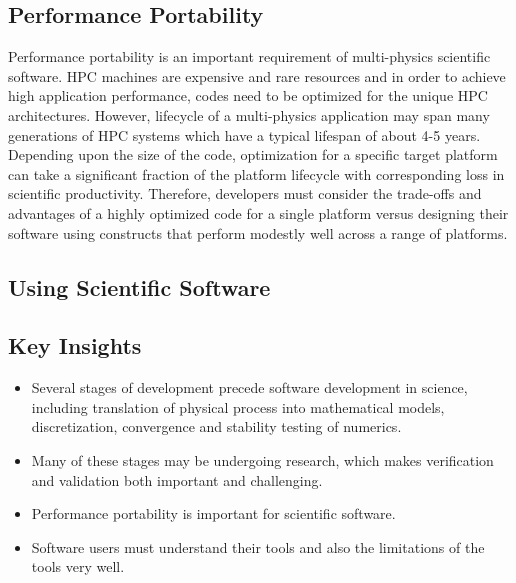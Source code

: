 \subsection{Performance Portability}
\label{sec:perfport}
Performance portability is an important requirement of multi-physics
scientific software. HPC machines are expensive and rare resources and in
order to achieve high application performance, codes need to be
optimized for the unique HPC architectures. However, lifecycle of a
multi-physics application may span many generations of HPC systems
which have a typical lifespan of about 4-5 years.  Depending upon the
size of the code, optimization for a specific target platform can take
a significant fraction of the platform lifecycle with corresponding
loss in scientific productivity.  Therefore, developers  must consider
the trade-offs and advantages of a highly optimized code for a single
platform versus designing their software using constructs that perform
modestly well across a range of platforms.  



\subsection{Using Scientific Software}


\subsection*{Key Insights}
\label{lifecycle-insights}
\begin{itemize}
\item Several stages of development precede software development in
  science, including translation of physical process into mathematical
  models, discretization, convergence and stability testing of
  numerics.
\item Many of these stages may be undergoing research, which makes
  verification and validation both important and challenging.
\item Performance portability is important for scientific software.
\item Software users must understand their tools and also the
  limitations of the tools very well.
\end{itemize}